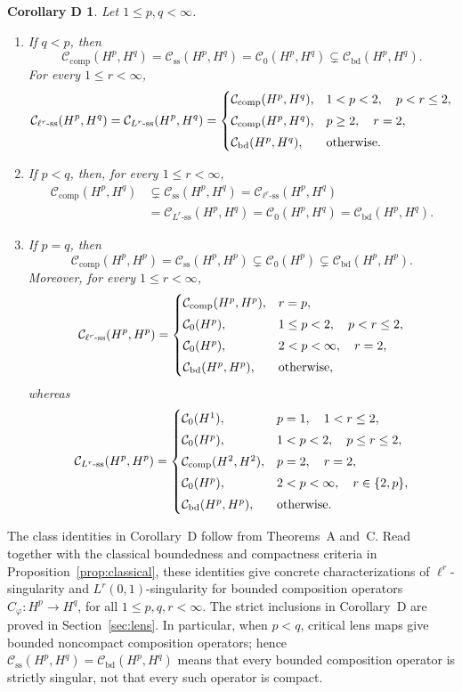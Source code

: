 \documentclass[11pt, reqno]{amsart}
\newtheorem*{corollaryD}{Corollary D}
\theoremstyle{definition}
\theoremstyle{remark}
\newcommand{\CB}{\mathcal C_{\mathrm{bd}}}
\newcommand{\CK}{\mathcal C_{\mathrm{comp}}}
\newcommand{\CS}{\mathcal C_{\mathrm{ss}}}
\newcommand{\CSell}[1]{\mathcal C_{\ell^{#1}\text{-ss}}}
\newcommand{\CSL}[1]{\mathcal C_{L^{#1}\text{-ss}}}
\begin{document}
\begin{corollaryD}
Let \(1\le p,q<\infty\). 

\begin{enumerate}[label=\textup{(\roman*)}]
\item If \(q<p\), then
\[
\CK(H^p,H^q)
=
\CS(H^p,H^q)
=
\mathcal C_0(H^p,H^q)
\subsetneq
\CB(H^p,H^q).
\]
For every \(1\le r<\infty\),
\[
\CSell{r}(H^p,H^q)
=
\CSL{r}(H^p,H^q)
=
\begin{cases}
\CK(H^p,H^q),
& 1<p<2,\quad p<r\le2,\\[1mm]
\CK(H^p,H^q),
& p\ge2,\quad r=2,\\[1mm]
\CB(H^p,H^q),
& \textup{otherwise}.
\end{cases}
\]

\item If \(p<q\), then, for every \(1\le r<\infty\),
\[
\begin{aligned}
\CK(H^p,H^q)
&\subsetneq
\CS(H^p,H^q)
=
\CSell{r}(H^p,H^q)\\
&=
\CSL{r}(H^p,H^q)
=
\mathcal C_0(H^p,H^q)
=
\CB(H^p,H^q).
\end{aligned}
\]

\item If \(p=q\), then
\[
\CK(H^p,H^p)
=
\CS(H^p,H^p)
\subsetneq
\mathcal C_0(H^p)
\subsetneq
\CB(H^p,H^p).
\]
Moreover, for every \(1\le r<\infty\),
\[
\CSell{r}(H^p,H^p)
=
\begin{cases}
\CK(H^p,H^p),
& r=p,\\[1mm]
\mathcal C_0(H^p),
& 1\le p<2,\quad p<r\le2,\\[1mm]
\mathcal C_0(H^p),
& 2<p<\infty,\quad r=2,\\[1mm]
\CB(H^p,H^p),
& \textup{otherwise},
\end{cases}
\]
whereas
\[
\CSL{r}(H^p,H^p)
=
\begin{cases}
\mathcal C_0(H^1),
& p=1,\quad 1<r\le2,\\[1mm]
\mathcal C_0(H^p),
& 1<p<2,\quad p\le r\le2,\\[1mm]
\CK(H^2,H^2),
& p=2,\quad r=2,\\[1mm]
\mathcal C_0(H^p),
& 2<p<\infty,\quad r\in\{2,p\},\\[1mm]
\CB(H^p,H^p),
& \textup{otherwise}.
\end{cases}
\]
\end{enumerate}
\end{corollaryD}

The class identities in Corollary~D follow from Theorems~A and~C.
Read together with the classical boundedness and compactness criteria
in Proposition~\ref{prop:classical}, these identities give concrete
characterizations of \(\ell^r\)-singularity and
\(L^r(0,1)\)-singularity for bounded composition operators
\(C_\varphi:H^p\to H^q\), for all \(1\le p,q,r<\infty\).
The strict inclusions in Corollary~D are proved in
Section~\ref{sec:lens}. In particular, when \(p<q\), critical lens
maps give bounded noncompact composition operators; hence
\(\CS(H^p,H^q)=\CB(H^p,H^q)\) means that every bounded composition
operator is strictly singular, not that every such operator is compact.
\end{document}

